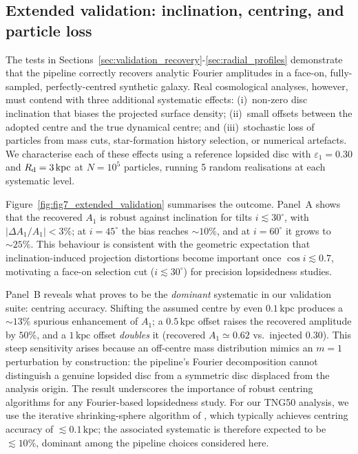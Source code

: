 \documentclass[fleqn,usenatbib]{mnras}
\newcommand{\Am}[1]{A_{#1}}
\newcommand{\kpc}{\,\mathrm{kpc}}
\newcommand{\Rd}{R_{\rm d}}
\newcommand{\Amone}{\ensuremath{\Am{1}}}
\begin{document}
\subsection{Extended validation: inclination, centring, and particle loss}
\label{sec:extended_validation}

The tests in Sections~\ref{sec:validation_recovery}-\ref{sec:radial_profiles}
demonstrate that the pipeline correctly recovers analytic Fourier
amplitudes in a face-on, fully-sampled, perfectly-centred synthetic
galaxy.  Real cosmological analyses, however, must contend with three
additional systematic effects: (i)~non-zero disc inclination that
biases the projected surface density; (ii)~small offsets between the
adopted centre and the true dynamical centre; and (iii)~stochastic
loss of particles from mass cuts, star-formation history selection,
or numerical artefacts.  We characterise each of these effects using
a reference lopsided disc with $\varepsilon_1 = 0.30$ and
$\Rd = 3\kpc$ at $N = 10^5$ particles, running 5 random realisations
at each systematic level.

Figure~\ref{fig:fig7_extended_validation} summarises the outcome.
Panel~A shows that the recovered $\Amone$ is robust against
inclination for tilts $i \lesssim 30^{\circ}$, with $|\Delta \Amone /
\Amone| < 3\%$; at $i = 45^{\circ}$ the bias reaches $\sim 10\%$, and
at $i = 60^{\circ}$ it grows to $\sim 25\%$.  This behaviour is
consistent with the geometric expectation that inclination-induced
projection distortions become important once $\cos i \lesssim 0.7$,
motivating a face-on selection cut ($i \lesssim 30^{\circ}$) for
precision lopsidedness studies.

Panel~B reveals what proves to be the \emph{dominant} systematic
in our validation suite: centring accuracy.  Shifting the assumed
centre by even $0.1\kpc$ produces a $\sim 13\%$ spurious enhancement
of $\Amone$; a $0.5\kpc$ offset raises the recovered amplitude by
$50\%$, and a $1\kpc$ offset \emph{doubles} it (recovered $\Amone
\simeq 0.62$ vs.\ injected $0.30$).  This steep sensitivity arises
because an off-centre mass distribution mimics an $m=1$ perturbation
by construction: the pipeline's Fourier decomposition cannot
distinguish a genuine lopsided disc from a symmetric disc displaced
from the analysis origin.  The result underscores the importance of
robust centring algorithms for any Fourier-based lopsidedness study.
For our TNG50 analysis, we use the iterative shrinking-sphere
algorithm of \citet{2003MNRAS.338...14P}, which typically achieves centring
accuracy of $\lesssim 0.1\kpc$; the associated systematic is
therefore expected to be $\lesssim 10\%$, dominant among the
pipeline choices considered here.
\end{document}
